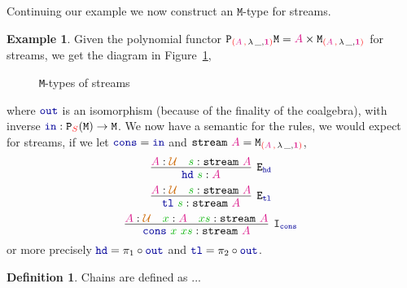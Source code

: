 \documentclass[twoside,11pt,openright]{report}
\theoremstyle{plain} %
\theoremstyle{definition}
\newtheorem{defn}{Definition}[section]
\newtheorem{exmp}{Example}[section]
\theoremstyle{remark}
\newcommand*{\figref}[1]{Figure~\ref{fig:#1}}
\newcommand*{\term}[1]{\textcolor{green!70!black}{#1}} %
\newcommand*{\type}[1]{\textcolor{magenta!90!black}{#1}}
\newcommand*{\container}[1]{\textcolor{red}{#1}}
\newcommand*{\containerpair}[2]{\textcolor{red}{(}#1\,\textcolor{red}{,}\,#2\textcolor{red}{)}}
\newcommand*{\universe}[1]{\textcolor{orange!80!black}{#1}}
\newcommand*{\unit}{\type{\textbf{1}}}
\newcommand*{\function}[1]{\textcolor{blue!60!black}{\ensuremath{\mathtt{#1}}}}
\newcommand*{\typeformer}[1]{\ensuremath{\mathtt{#1}}}
\newcommand*{\functor}[1]{\ensuremath{\mathbf{\mathtt{#1}}}}
\begin{document}
\noindent Continuing our example we now construct an \(\mathtt{M}\)-type for streams.
\begin{exmp} Given the polynomial functor \(\functor{P}_{\containerpair{\type{A}}{\lambda\,\_,\unit}} \typeformer{M} = \type{A} \times \typeformer{M}_{\containerpair{\type{A}}{\lambda\,\_,\unit}}\) for streams, we get the diagram in \figref{stream-M-type},
  \begin{figure}[h]
    \centering
    \caption{\texttt{M}-types of streams}
    \label{fig:stream-M-type}
  \end{figure}
  where \(\function{out}\) is an isomorphism (because of the finality of the coalgebra), with inverse \(\function{in} : \functor{P}_{\container{S}}(\typeformer{M}) \rightarrow \typeformer{M}\). We now have a semantic for the rules, we would expect for streams, if we let \(\function{cons} = \function{in}\) and \(\typeformer{stream}~\type{A} = \typeformer{M}_{\containerpair{\type{A}}{\lambda\,\_,\unit}}\),
  \begin{equation}
    \infer[\mathtt{E}_{\function{hd}}]{\function{hd}~\term{s} : \type{A}}{\type{A} : \universe{\mathcal{U}} & \term{s} : \typeformer{stream}~\type{A}}
  \end{equation}
  \begin{equation}
    \infer[\mathtt{E}_{\function{tl}}]{\function{tl}~\term{s} : \typeformer{stream}~\type{A}}{\type{A} : \universe{\mathcal{U}} & \term{s} : \typeformer{stream}~\type{A}}
  \end{equation}
  \begin{equation}
    \infer[\mathtt{I}_{\function{cons}}]{\term{\function{cons}}~\term{x}~\term{xs} : \typeformer{stream}~\type{A}}{\type{A} : \universe{\mathcal{U}} & \term{x} : \type{A} & \term{xs} : \typeformer{stream}~\type{A}}
  \end{equation}
  or more precisely \(\function{hd} = \pi_1 \circ \function{out}\) and \(\function{tl} = \pi_2 \circ \function{out}\).
\end{exmp}
\begin{defn}
  Chains are defined as ... \todo[inline]{define chains, \(\function{\pi}_{(n)}\) and \(\type{X}_n\)}
\end{defn}
\end{document}
